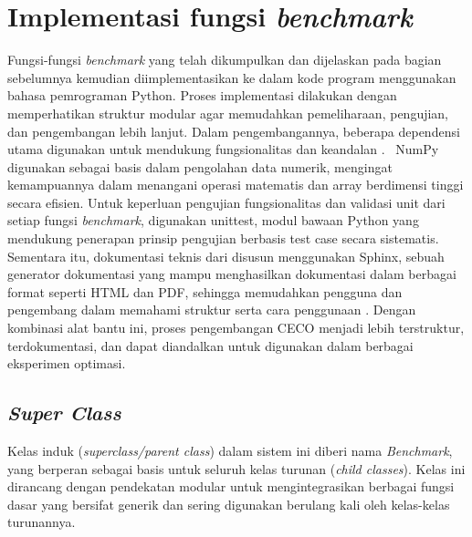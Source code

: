 \section{Implementasi fungsi \textit{benchmark}}
Fungsi-fungsi \textit{benchmark} yang telah dikumpulkan dan dijelaskan pada bagian sebelumnya kemudian diimplementasikan ke dalam kode program menggunakan bahasa pemrograman Python. Proses implementasi dilakukan dengan memperhatikan struktur modular agar memudahkan pemeliharaan, pengujian, dan pengembangan lebih lanjut. Dalam pengembangannya, beberapa dependensi utama digunakan untuk mendukung fungsionalitas dan keandalan .\  NumPy digunakan sebagai basis dalam pengolahan data numerik, mengingat kemampuannya dalam menangani operasi matematis dan array berdimensi tinggi secara efisien. Untuk keperluan pengujian fungsionalitas dan validasi unit dari setiap fungsi \textit{benchmark}, digunakan unittest, modul bawaan Python yang mendukung penerapan prinsip pengujian berbasis test case secara sistematis. Sementara itu, dokumentasi teknis dari  disusun menggunakan Sphinx, sebuah generator dokumentasi yang mampu menghasilkan dokumentasi dalam berbagai format seperti HTML dan PDF, sehingga memudahkan pengguna dan pengembang dalam memahami struktur serta cara penggunaan . Dengan kombinasi alat bantu ini, proses pengembangan  CECO menjadi lebih terstruktur, terdokumentasi, dan dapat diandalkan untuk digunakan dalam berbagai eksperimen optimasi.

\subsection{\textit{Super Class}}
Kelas induk (\textit{superclass/parent class}) dalam sistem ini diberi nama \textit{Benchmark}, yang berperan sebagai basis untuk seluruh kelas turunan (\textit{child classes}). Kelas ini dirancang dengan pendekatan modular untuk mengintegrasikan berbagai fungsi dasar yang bersifat generik dan sering digunakan berulang kali oleh kelas-kelas turunannya.\\
